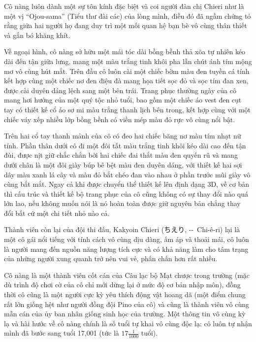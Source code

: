\documentclass[../main.tex]{subfiles}
\begin{document}
Cô nàng luôn dành một sự tôn kính đặc biệt và coi người đàn chị Chieri như là một vị ``Ojou-sama'' (Tiểu thư đài các) của lòng mình, điều đó đã ngầm chứng tỏ rằng giữa hai người họ đang duy trì một mối quan hệ bạn bè vô cùng thân thiết và gắn bó khăng khít.

Về ngoại hình, cô nàng sở hữu một mái tóc dài bồng bềnh thả xõa tự nhiên kéo dài đến tận giữa lưng, mang một màu trắng tinh khôi pha lẫn chút ánh tím mộng mơ vô cùng hút mắt. Trên đầu cô luôn cài một chiếc bờm màu đen tuyền cá tính kết hợp cùng một chiếc nơ đen điệu đà mang họa tiết sọc đỏ và sọc tím đan xen, được cài duyên dáng lệch sang một bên trái. Trang phục thường ngày của cô mang hơi hướng của một quý tộc nhỏ tuổi, bao gồm một chiếc áo vest đen cụt tay có thiết kế cổ áo sơ mi màu trắng thanh lịch bên trong, kết hợp cùng với một chiếc váy xếp nhiều lớp bồng bềnh có viền mép màu đỏ rực vô cùng nổi bật.

Trên hai cổ tay thanh mảnh của cô có đeo hai chiếc băng nơ màu tím nhạt nữ tính. Phần thân dưới cô đi một đôi tất màu trắng tinh khôi kéo dài cao đến tận đùi, được nịt giữ chắc chắn bởi hai chiếc đai thắt màu đen quyến rũ và mang dưới chân là một đôi giày búp bê bệt màu đen duyên dáng, với thiết kế hai sợi dây màu xanh lá cây và màu đỏ bắt chéo đan vào nhau ở phần trước mũi giày vô cùng bắt mắt. Ngay cả khi được chuyển thể thiết kế lên định dạng 3D, về cơ bản thì cấu trúc và thiết kế bộ trang phục của cô cũng không có sự thay đổi nào quá lớn lao, nếu không muốn nói là nó hoàn toàn được giữ nguyên bản chẳng thay đổi bất cứ một chi tiết nhỏ nào cả.

Thành viên còn lại của đội thi đấu, Kakyoin Chieri (ちえり, --\ Chi-ê-ri) lại là một cô gái nổi tiếng với tính cách vô cùng dịu dàng, ấm áp và thoải mái, cô luôn là người mang đến nguồn năng lượng tích cực và có khả năng làm cho tâm trạng của những người xung quanh trở nên vui vẻ, phấn chấn hơn rất nhiều.


Cô nàng là một thành viên cốt cán của Câu lạc bộ Mạt chược trong trường (mặc dù trình độ chơi cờ của cô chỉ mới dừng lại ở mức độ cơ bản nhập môn), đồng thời cô cũng là một người cực kỳ yêu thích động vật hoang dã (một điểm chung rất lớn giống hệt như người đồng đội Pino của cô) và cũng là thành viên vô cùng mẫn cán của ủy ban nhân giống sinh học của trường. Một thông tin vô cùng kỳ lạ và hài hước về cô nàng chính là số tuổi tự khai vô cùng độc lạ: cô luôn tự nhận mình đã bước sang tuổi 17,001 (tức là \(17\frac{1}{1000}\) tuổi).
\end{document}
